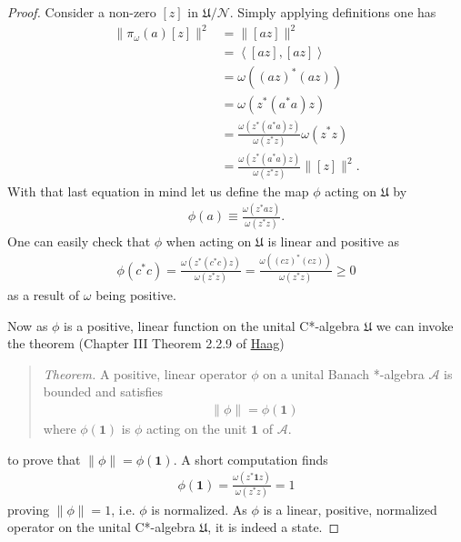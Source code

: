 \begin{proof}
Consider a non-zero $[z]$ in $\mathfrak{U} / \mathcal{N}$. Simply applying definitions one has
\begin{align}
    \|\pi_\omega(a)[z]\|^2 &= \|[az]\|^2 \\
                           &= \left<[az], [az]\right> \\
                           &= \omega((az)^*(az)) \\
                           &= \omega(z^*(a^*a)z) \\
                           &= \frac{\omega(z^*(a^*a)z)}{\omega(z^*z)} \omega(z^*z) \\
                           &= \frac{\omega(z^*(a^*a)z)}{\omega(z^*z)} \|[z]\|^2.
\end{align}
With that last equation in mind let us define the map $\phi$ acting on $\mathfrak{U}$ by
\begin{align}
    \phi(a) \equiv \frac{\omega(z^*az)}{\omega(z^*z)}.
\end{align}
One can easily check that $\phi$ when acting on $\mathfrak{U}$ is linear and positive as
\begin{align}
    \phi(c^*c) = \frac{\omega(z^*(c^*c)z)}{\omega(z^*z)} = \frac{\omega((cz)^*(cz))}{\omega(z^*z)} \ge 0
\end{align}
as a result of $\omega$ being positive.

Now as $\phi$ is a positive, linear function on the unital C*-algebra $\mathfrak{U}$ we can invoke the theorem (Chapter III Theorem 2.2.9 of \href{https://doi.org/10.1007/978-3-642-61458-3}{Haag})

\begin{quote}
    \textit{Theorem.} A positive, linear operator $\phi$ on a unital Banach *-algebra $\mathcal{A}$ is bounded and satisfies
    \begin{align}
        \|\phi\| = \phi(\mathbf{1})
    \end{align}
    where $\phi(\mathbf{1})$ is $\phi$ acting on the unit $\mathbf{1}$ of $\mathcal{A}$.
\end{quote}

\noindent to prove that $\|\phi\| = \phi(\mathbf{1})$. A short computation finds
\begin{align}
    \phi(\mathbf{1}) = \frac{\omega(z^*\mathbf{1}z)}{\omega(z^*z)} = 1
\end{align}
proving $\|\phi\|=1$, i.e. $\phi$ is normalized. As $\phi$ is a linear, positive, normalized operator on the unital C*-algebra $\mathfrak{U}$, it is indeed a state.


\end{proof}
